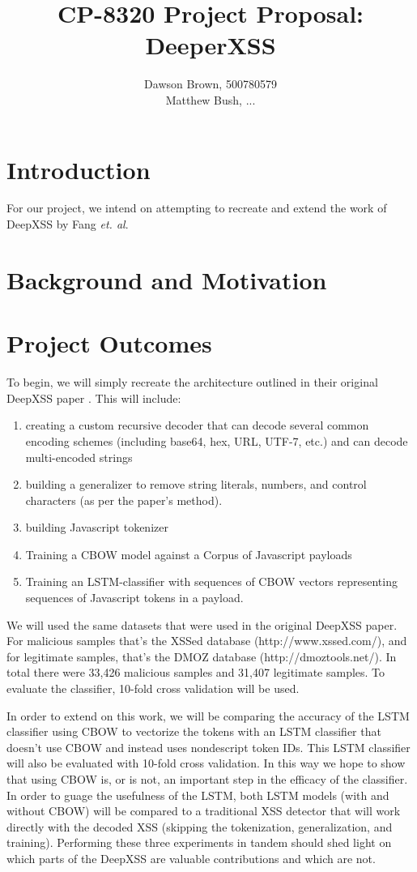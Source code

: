 \documentclass{llncs}
\title{CP-8320 Project Proposal: DeeperXSS}
\author{Dawson Brown, 500780579\\Matthew Bush, ...}
\institute{Ryerson University}
\date{}
\begin{document}
\maketitle
\pagestyle{plain}


\section{Introduction}
For our project, we intend on attempting to recreate and extend the work of DeepXSS by Fang \textit{et. al}. \cite{fang2018deepxss}

\section{Background and Motivation}


\section{Project Outcomes}
To begin, we will simply recreate the architecture outlined in their original DeepXSS paper \cite{fang2018deepxss}. This will include:

\begin{enumerate}
    \item creating a custom recursive decoder that can decode several common encoding schemes (including base64, hex, URL, UTF-7, etc.) and can decode multi-encoded strings 
    \item building a generalizer to remove string literals, numbers, and control characters (as per the paper's method).
    \item building Javascript tokenizer
    \item Training a CBOW model against a Corpus of Javascript payloads
    \item Training an LSTM-classifier with sequences of CBOW vectors representing sequences of Javascript tokens in a payload.
\end{enumerate}

We will used the same datasets that were used in the original DeepXSS paper. For malicious samples that's the XSSed database (http://www.xssed.com/), and for legitimate samples, that's the DMOZ database (http://dmoztools.net/). In total there were 33,426 malicious samples and 31,407 legitimate samples. To evaluate the classifier, 10-fold cross validation will be used. 

In order to extend on this work, we will be comparing the accuracy of the LSTM classifier using CBOW to vectorize the tokens with an LSTM classifier that doesn't use CBOW and instead uses nondescript token IDs. This LSTM classifier will also be evaluated with 10-fold cross validation. In this way we hope to show that using CBOW is, or is not, an important step in the efficacy of the classifier. In order to guage the usefulness of the LSTM, both LSTM models (with and without CBOW) will be compared to a traditional XSS detector that will work directly with the decoded XSS (skipping the tokenization, generalization, and training). Performing these three experiments in tandem should shed light on which parts of the DeepXSS are valuable contributions and which are not. 


\newpage


\end{document}
